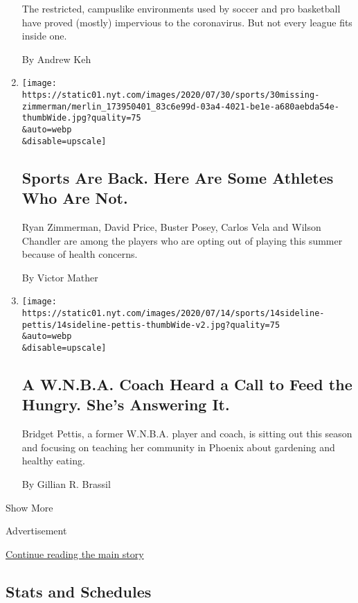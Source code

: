\begin{enumerate}
  The restricted, campuslike environments used by soccer and pro
  basketball have proved (mostly) impervious to the coronavirus. But not
  every league fits inside one.

  By Andrew Keh
\item
  \href{/2020/07/30/sports/players-opt-out.html}{}

  \texttt{[image: https://static01.nyt.com/images/2020/07/30/sports/30missing-zimmerman/merlin\_173950401\_83c6e99d-03a4-4021-be1e-a680aebda54e-thumbWide.jpg?quality=75\\\&auto=webp\\\&disable=upscale]}

  \hypertarget{sports-are-back-here-are-some-athletes-who-are-not}{%
  \subsection{Sports Are Back. Here Are Some Athletes Who Are
  Not.}\label{sports-are-back-here-are-some-athletes-who-are-not}}

  Ryan Zimmerman, David Price, Buster Posey, Carlos Vela and Wilson
  Chandler are among the players who are opting out of playing this
  summer because of health concerns.

  By Victor Mather
\item
  \href{/2020/07/30/sports/basketball/wnba-bridget-pettis.html}{}

  \texttt{[image: https://static01.nyt.com/images/2020/07/14/sports/14sideline-pettis/14sideline-pettis-thumbWide-v2.jpg?quality=75\\\&auto=webp\\\&disable=upscale]}

  \hypertarget{a-wnba-coach-heard-a-call-to-feed-the-hungry-shes-answering-it}{%
  \subsection{A W.N.B.A. Coach Heard a Call to Feed the Hungry. She's
  Answering
  It.}\label{a-wnba-coach-heard-a-call-to-feed-the-hungry-shes-answering-it}}

  Bridget Pettis, a former W.N.B.A. player and coach, is sitting out
  this season and focusing on teaching her community in Phoenix about
  gardening and healthy eating.

  By Gillian R. Brassil
\end{enumerate}

Show More

Advertisement

\protect\hyperlink{after-mid1}{Continue reading the main story}

\hypertarget{stats-and-schedules}{%
\subsection{Stats and Schedules}\label{stats-and-schedules}}

